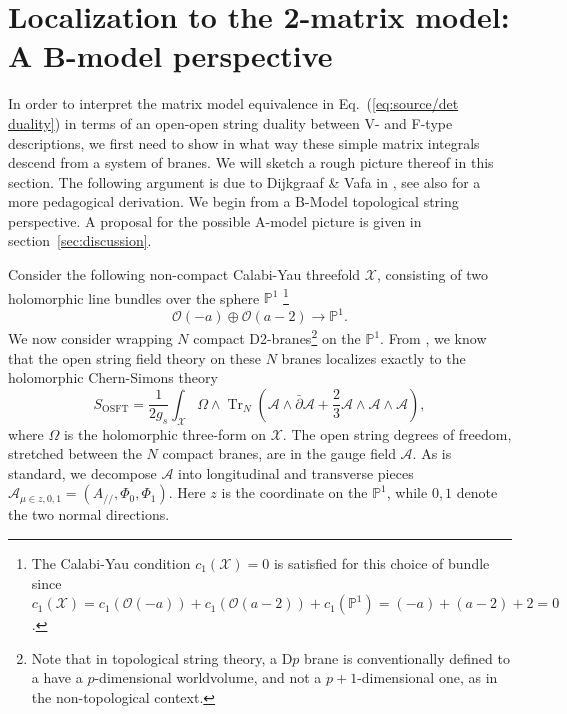 \documentclass[english]{article}
\DeclareMathOperator{\Tr}{Tr}
\let\mc=\mathcal
\let\mb=\mathbb
\begin{document}
\pagebreak

\appendix

\section{Localization to the 2-matrix model: A B-model perspective} \label{sec:holCSarg}
In order to interpret the matrix model equivalence in Eq.~(\ref{eq:source/det duality}) in terms of an open-open string duality between V- and F-type descriptions, we first need to show in what way these simple matrix integrals descend from a system of branes. We will sketch a rough picture thereof in this section. The following argument is due to Dijkgraaf \& Vafa in \cite{DijkgraafVafa02}, see also \cite{marino2004houches} for a more pedagogical derivation. 
We begin from a B-Model topological string perspective. A proposal for the possible A-model picture is given in section~\ref{sec:discussion}.

Consider the following non-compact Calabi-Yau threefold $\mc{X}$, consisting of two holomorphic line bundles over the sphere $\mathbb{P}^1$ \footnote{The Calabi-Yau condition $c_1(\mc{X})=0$ is satisfied for this choice of bundle since $c_1(\mc{X}) = c_1(\mc{O}(-a))+ c_1(\mc{O}(a-2))+ c_1(\mathbb{P}^1)=(-a)+(a-2)+2=0$.}
\begin{equation}
    \mc{O}(-a) \oplus \mc{O}(a-2) \rightarrow \mathbb{P}^1.
\end{equation}
We now consider wrapping $N$ compact D2-branes\footnote{Note that in topological string theory, a D$p$ brane is conventionally defined to a have a $p$-dimensional worldvolume, and not a $p+1$-dimensional one, as in the non-topological context.} on the $\mb{P}^1$. From \cite{WittenCSasOSFT}, we know that the open string field theory on these $N$ branes localizes exactly to the holomorphic Chern-Simons theory
\begin{equation}
    S_{\text{OSFT}}= \frac{1}{2g_s} \int_{\mc{X}} \Omega \wedge \Tr_{N} \left( \mc{A} \wedge \bar{\partial } \mc{A} + \frac{2}{3}\mc{A} \wedge \mc{A} \wedge \mc{A} \right),
\end{equation}
where $\Omega$ is the holomorphic three-form on $\mc{X}$. The open string degrees of freedom, stretched between the $N$ compact branes, are in the gauge field $\mc{A}$. As is standard, we decompose $\mc{A}$ into longitudinal and transverse pieces $\mc{A}_{\mu \in z,0,1}=(A_{//},\Phi_0,\Phi_1)$. Here $z$ is the coordinate on the $\mb{P}^1$, while $0,1$ denote the two normal directions. 
\end{document}
